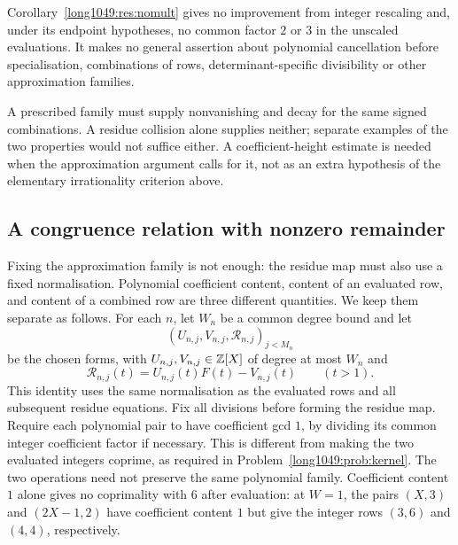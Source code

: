 \documentclass[11pt]{article}
\begin{document}
Corollary~\ref{long1049:res:nomult} gives no improvement from integer
rescaling and, under its endpoint hypotheses, no common factor $2$ or
$3$ in the unscaled evaluations. It makes no general assertion about
polynomial cancellation before specialisation, combinations of rows,
determinant-specific divisibility or other approximation families.

A prescribed family must supply nonvanishing and decay for the same
signed combinations. A residue collision alone supplies neither;
separate examples of the two properties would not suffice either.
A coefficient-height estimate is needed when the approximation
argument calls for it, not as an extra hypothesis of the elementary
irrationality criterion above.

\subsection{A congruence relation with nonzero remainder}

Fixing the approximation family is not enough: the residue map
must also use a fixed normalisation. Polynomial coefficient content,
content of an evaluated row, and content of a combined row are
three different quantities. We keep them separate as follows.
For each $n$, let $W_n$ be a common degree bound and let
\[
 (U_{n,j},V_{n,j},\mathcal R_{n,j})_{j<M_n}
\]
be the chosen forms, with $U_{n,j},V_{n,j}\in\mathbb{Z}[X]$ of degree at most
$W_n$ and
\[
 \mathcal R_{n,j}(t)=U_{n,j}(t)F(t)-V_{n,j}(t)\qquad(t>1).
\]
This identity uses the same normalisation as the evaluated rows and
all subsequent residue equations. Fix all divisions before forming the
residue map. Require each
polynomial pair to have coefficient gcd $1$, by dividing its common
integer coefficient factor if necessary. This is different from making
the two evaluated integers coprime, as required in
Problem~\ref{long1049:prob:kernel}. The two operations need not preserve
the same polynomial family. Coefficient content $1$ alone gives no
coprimality with $6$ after evaluation: at $W=1$, the pairs $(X,3)$
and $(2X-1,2)$ have coefficient content $1$ but give the integer rows
$(3,6)$ and $(4,4)$, respectively.
\end{document}

